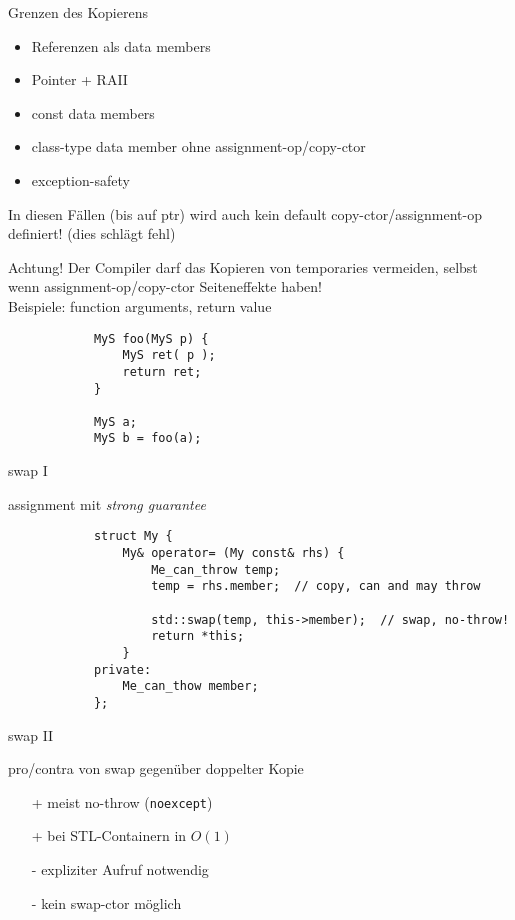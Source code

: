 \begin{frame}{Grenzen des Kopierens}
	\begin{itemize}
		\item Referenzen als data members
		\item Pointer + RAII
		\item const data members
		\item class-type data member ohne assignment-op/copy-ctor
		\item exception-safety
	\end{itemize}
	
	In diesen Fällen (bis auf ptr) wird auch kein default copy-ctor/assignment-op definiert! (dies schlägt fehl)
		
	\begin{block}{Achtung!}
		Der Compiler darf das Kopieren von temporaries vermeiden, selbst wenn assignment-op/copy-ctor Seiteneffekte haben!\\
		Beispiele: function arguments, return value
	
		\begin{lstlisting}
			MyS foo(MyS p) {
			    MyS ret( p );
			    return ret;
			}
		
			MyS a;
			MyS b = foo(a);
		\end{lstlisting}
	\end{block}
\end{frame}

\begin{frame}[fragile]{swap I}
	\begin{block}{ assignment mit \emph{strong guarantee} }
		\begin{lstlisting}
			struct My {
			    My& operator= (My const& rhs) {
			        Me_can_throw temp;
			        temp = rhs.member;	// copy, can and may throw
					
			        std::swap(temp, this->member);	// swap, no-throw!
			        return *this;
			    }
			private:
			    Me_can_thow member;
			};
		\end{lstlisting}
	\end{block}
\end{frame}

\begin{frame}{swap II}
	\begin{block}{pro/contra von swap gegenüber doppelter Kopie}
		\begin{itemize}
			\item[+] meist no-throw (\texttt{noexcept})
			\item[+] bei STL-Containern in $O(1)$
			\item[-] expliziter Aufruf notwendig
			\item[-] kein swap-ctor möglich
		\end{itemize}
	\end{block}
\end{frame}

